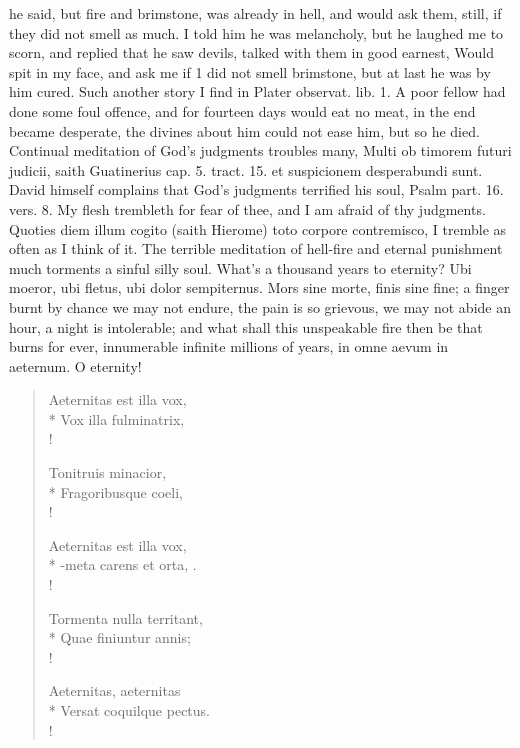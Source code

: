 {he said, but fire and brimstone, was already in hell, and would ask
them, still, if they did not smell as much. I told him he was
melancholy, but he laughed me to scorn, and replied that he saw devils,
talked with them in good earnest, Would spit in my face, and ask me if
1 did not smell brimstone, but at last he was by him cured. Such
another story I find in Plater observat. lib. 1. A poor fellow had done
some foul offence, and for fourteen days would eat no meat, in the end
became desperate, the divines about him could not ease him, but
so he died. Continual meditation of God's judgments troubles many,
Multi ob timorem futuri judicii, saith Guatinerius cap. 5. tract. 15.
et suspicionem desperabundi sunt. David himself complains that God's
judgments terrified his soul, Psalm  part. 16. vers. 8. My flesh
trembleth for fear of thee, and I am afraid of thy judgments. Quoties
diem illum cogito (saith Hierome) toto corpore contremisco, I
tremble as often as I think of it. The terrible meditation of hell-fire
and eternal punishment much torments a sinful silly soul. What's a
thousand years to eternity? Ubi moeror, ubi fletus, ubi dolor
sempiternus. Mors sine morte, finis sine fine; a finger burnt by chance
we may not endure, the pain is so grievous, we may not abide an hour, a
night is intolerable; and what shall this unspeakable fire then be that
burns for ever, innumerable infinite millions of years, in omne aevum
in aeternum. O eternity!


\begin{latin}
\begin{verse}
Aeternitas est illa vox,\\*
Vox illa fulminatrix,\\!

Tonitruis minacior,\\*
Fragoribusque coeli,\\!

Aeternitas est illa vox,\\*
-meta carens et orta, \etc{}.\\!

Tormenta nulla territant,\\*
Quae finiuntur annis;\\!

Aeternitas, aeternitas\\*
Versat coquilque pectus.\\!


\end{verse}
\end{latin}}
